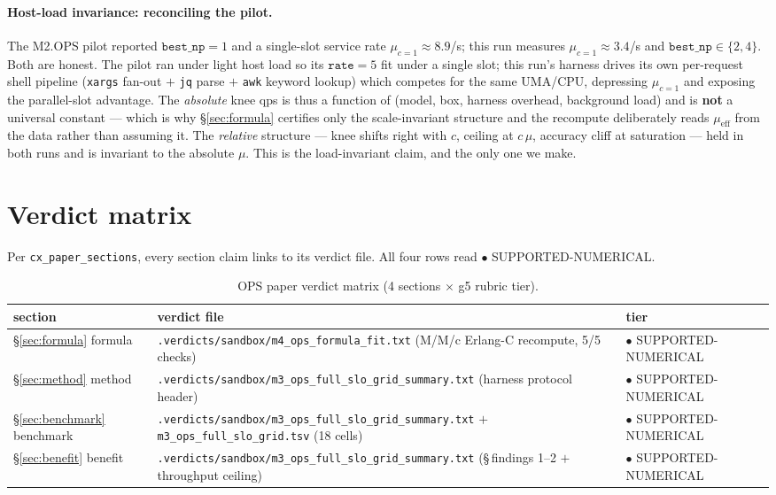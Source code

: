 \documentclass[11pt,a4paper]{article}
\begin{document}
\paragraph{Host-load invariance: reconciling the pilot.} The M2.OPS pilot
reported \(\texttt{best\_np}{=}1\) and a single-slot service rate
\(\mu_{c=1}\approx8.9\)/s; this run measures \(\mu_{c=1}\approx3.4\)/s and
\(\texttt{best\_np}\in\{2,4\}\). Both are honest. The pilot ran under light host
load so its \(\texttt{rate}{=}5\) fit under a single slot; this run's harness
drives its own per-request shell pipeline (\texttt{xargs} fan-out \(+\)
\texttt{jq} parse \(+\) \texttt{awk} keyword lookup) which competes for the same
UMA/CPU, depressing \(\mu_{c=1}\) and exposing the parallel-slot advantage. The
\emph{absolute} knee qps is thus a function of (model, box, harness overhead,
background load) and is \textbf{not} a universal constant --- which is why
\S\ref{sec:formula} certifies only the scale-invariant structure and the
recompute deliberately reads \(\mu_{\mathrm{eff}}\) from the data rather than
assuming it. The \emph{relative} structure --- knee shifts right with \(c\),
ceiling at \(c\,\mu\), accuracy cliff at saturation --- held in both runs and is
invariant to the absolute \(\mu\). This is the load-invariant claim, and the only
one we make.

\section{Verdict matrix}
\label{sec:verdict-matrix}
Per \texttt{cx\_paper\_sections}, every section claim links to its verdict file.
All four rows read \(\bullet\) SUPPORTED-NUMERICAL.

\begin{table}[h]
\centering
\caption{OPS paper verdict matrix (4 sections \(\times\) g5 rubric tier).}
\begin{tabular}{lll}
\toprule
section & verdict file & tier \\
\midrule
\S\ref{sec:formula} formula     & \texttt{.verdicts/sandbox/m4\_ops\_formula\_fit.txt} (M/M/c Erlang-C recompute, 5/5 checks) & \textcolor{green!50!black}{$\bullet$ SUPPORTED-NUMERICAL} \\
\S\ref{sec:method} method       & \texttt{.verdicts/sandbox/m3\_ops\_full\_slo\_grid\_summary.txt} (harness protocol header) & \textcolor{green!50!black}{$\bullet$ SUPPORTED-NUMERICAL} \\
\S\ref{sec:benchmark} benchmark & \texttt{.verdicts/sandbox/m3\_ops\_full\_slo\_grid\_summary.txt} \(+\) \texttt{m3\_ops\_full\_slo\_grid.tsv} (18 cells) & \textcolor{green!50!black}{$\bullet$ SUPPORTED-NUMERICAL} \\
\S\ref{sec:benefit} benefit     & \texttt{.verdicts/sandbox/m3\_ops\_full\_slo\_grid\_summary.txt} (\S\,findings 1--2 \(+\) throughput ceiling) & \textcolor{green!50!black}{$\bullet$ SUPPORTED-NUMERICAL} \\
\bottomrule
\end{tabular}
\end{table}
\end{document}
